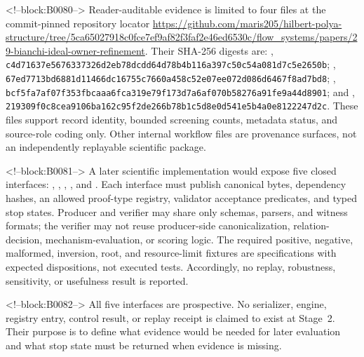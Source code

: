 \documentclass[11pt,a4paper]{article}
\begin{document}
<!--block:B0080-->
Reader-auditable evidence is limited to four files at the commit-pinned repository locator \url{https://github.com/maris205/hilbert-polya-structure/tree/5ca65027918c0fce7ef9af82f3faf2e46ed6530c/flow_systems/papers/29-bianchi-ideal-owner-refinement}. Their SHA-256 digests are: , \texttt{c4d71637\allowbreak{}e5676337\allowbreak{}326d2eb7\allowbreak{}8dcdd64d\allowbreak{}78b4b116\allowbreak{}a397c50c\allowbreak{}54a081d7\allowbreak{}c5e2650b}; , \texttt{67ed7713\allowbreak{}bd6881d1\allowbreak{}1466dc16\allowbreak{}755c7660\allowbreak{}a458c52e\allowbreak{}07ee072d\allowbreak{}086d6467\allowbreak{}f8ad7bd8}; , \texttt{bcf5fa7a\allowbreak{}f07f353f\allowbreak{}bcaaa6fc\allowbreak{}a319e79f\allowbreak{}173d7a6a\allowbreak{}f070b582\allowbreak{}76a91fe9\allowbreak{}a44d8901}; and , \texttt{219309f0\allowbreak{}c8cea910\allowbreak{}6ba162c9\allowbreak{}5f2de266\allowbreak{}b78b1c5d\allowbreak{}8e0d541e\allowbreak{}5b4a0e81\allowbreak{}22247d2c}. These files support record identity, bounded screening counts, metadata status, and source-role coding only. Other internal workflow files are provenance surfaces, not an independently replayable scientific package.

<!--block:B0081-->
A later scientific implementation would expose five closed interfaces: , , , , and . Each interface must publish canonical bytes, dependency hashes, an allowed proof-type registry, validator acceptance predicates, and typed stop states. Producer and verifier may share only schemas, parsers, and witness formats; the verifier may not reuse producer-side canonicalization, relation-decision, mechanism-evaluation, or scoring logic. The required positive, negative, malformed, inversion, root, and resource-limit fixtures are specifications with expected dispositions, not executed tests. Accordingly, no replay, robustness, sensitivity, or usefulness result is reported.

<!--block:B0082-->
All five interfaces are prospective. No serializer, engine, registry entry, control result, or replay receipt is claimed to exist at Stage~2. Their purpose is to define what evidence would be needed for later evaluation and what stop state must be returned when evidence is missing.
\end{document}
